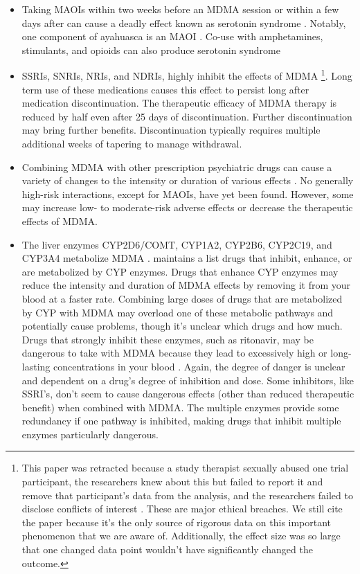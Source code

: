 \documentclass[12pt,letterpaper]{book}
\begin{document}
\begin{itemize}
    \item Taking MAOIs within two weeks before an MDMA session or within a few days after can cause a deadly effect known as serotonin syndrome \cite{malcolmSerotonin,edinoffInteractions}. Notably, one component of ayahuasca is an MAOI \cite{ruffell2020pharmacological}. Co-use with amphetamines, stimulants, and opioids can also produce serotonin syndrome \cite{makunts2022reported}
    \item SSRIs, SNRIs, NRIs, and NDRIs, highly inhibit the effects of MDMA \cite{feducciaSSRIDiscontinuation}\footnote{\label{ssriRetraction}This paper was retracted because a study therapist sexually abused one trial participant, the researchers knew about this but failed to report it and remove that participant's data from the analysis, and the researchers failed to disclose conflicts of interest \cite{feduccia2024retraction,nytimesRetraction}. These are major ethical breaches. We still cite the paper because it's the only source of rigorous data on this important phenomenon that we are aware of. Additionally, the effect size was so large that one changed data point wouldn't have significantly changed the outcome.}. Long term use of these medications causes this effect to persist long after medication discontinuation. The therapeutic efficacy of MDMA therapy is reduced by half even after 25 days of discontinuation. Further discontinuation may bring further benefits. Discontinuation typically requires multiple additional weeks of tapering to manage withdrawal.
    \item Combining MDMA with other prescription psychiatric drugs can cause a variety of changes to the intensity or duration of various effects \cite{sarparastDrugInteractions}. No generally high-risk interactions, except for MAOIs, have yet been found. However, some may increase low- to moderate-risk adverse effects or decrease the therapeutic effects of MDMA.
    \item The liver enzymes CYP2D6/COMT, CYP1A2, CYP2B6, CYP2C19, and CYP3A4 metabolize MDMA \cite{torreEnzymes,sarparastDrugInteractions}. \textcite{flockartTable} maintains a list drugs that inhibit, enhance, or are metabolized by CYP enzymes. Drugs that enhance CYP enzymes may reduce the intensity and duration of MDMA effects by removing it from your blood at a faster rate. Combining large doses of drugs that are metabolized by CYP with MDMA may overload one of these metabolic pathways and potentially cause problems, though it's unclear which drugs and how much. Drugs that strongly inhibit these enzymes, such as ritonavir, may be dangerous to take with MDMA because they lead to excessively high or long-lasting concentrations in your blood \cite{sarparastDrugInteractions}. Again, the degree of danger is unclear and dependent on a drug's degree of inhibition and dose. Some inhibitors, like SSRI's, don't seem to cause dangerous effects (other than reduced therapeutic benefit) when combined with MDMA. The multiple enzymes provide some redundancy if one pathway is inhibited, making drugs that inhibit multiple enzymes particularly dangerous.

\end{itemize}
\end{document}
